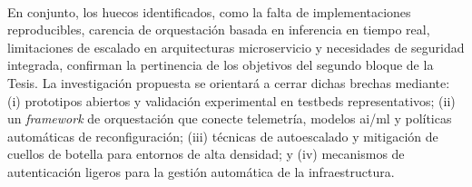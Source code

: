 \\
En conjunto, los huecos identificados, como la falta de implementaciones reproducibles, carencia de orquestación basada en inferencia en tiempo real, limitaciones de escalado en arquitecturas microservicio y necesidades de seguridad integrada, confirman la pertinencia de los objetivos del segundo bloque de la Tesis. La investigación propuesta se orientará a cerrar dichas brechas mediante: (i) prototipos abiertos y validación experimental en testbeds representativos; (ii) un \textit{framework} de orquestación que conecte telemetría, modelos \gls{ai}/\gls{ml} y políticas automáticas de reconfiguración; (iii) técnicas de autoescalado y mitigación de cuellos de botella para entornos de alta densidad; y (iv) mecanismos de autenticación ligeros para la gestión automática de la infraestructura.